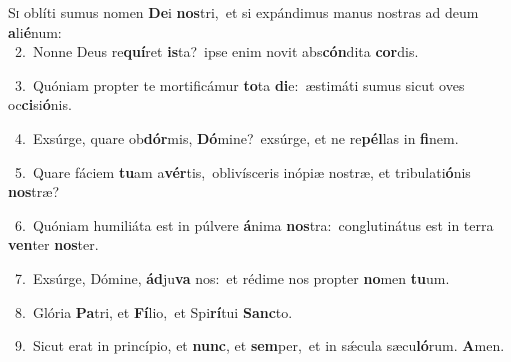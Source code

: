 \lettrine{\initial\textcolor{\initialcolor}{S}}{i} oblíti sumus nomen \textbf{De}\-i \textbf{nos}\-tri,~\star et si expándimus manus nostras ad deum \textbf{a}\-li\-\textbf{é}\-num:\\
{\numbfont\textcolor{\numbcolor}{~2.}}~Nonne Deus re\-\textbf{quí}\-ret \textbf{is}\-ta?~\star ipse enim novit abs\-\textbf{cón}\-dita \textbf{cor}\-dis.\par
{\numbfont\textcolor{\numbcolor}{~3.}}~Quóniam propter te mortificámur \textbf{to}\-ta \textbf{di}\-e:~\star æstimáti sumus sicut oves oc\-\textbf{ci}\-si\-\textbf{ó}\-nis.\par
{\numbfont\textcolor{\numbcolor}{~4.}}~Exsúrge, quare ob\-\textbf{dór}\-mis, \textbf{Dó}\-mine?~\star exsúrge, et ne re\-\textbf{pél}\-las in \textbf{fi}\-nem.\par
{\numbfont\textcolor{\numbcolor}{~5.}}~Quare fáciem \textbf{tu}\-am a\-\textbf{vér}\-tis,~\star oblivísceris inópiæ nostræ, et tribulati\-\textbf{ó}\-nis \textbf{nos}\-træ?\par
{\numbfont\textcolor{\numbcolor}{~6.}}~Quóniam humiliáta est in púlvere \textbf{á}\-nima \textbf{nos}\-tra:~\star conglutinátus est in terra \textbf{ven}\-ter \textbf{nos}\-ter.\par
{\numbfont\textcolor{\numbcolor}{~7.}}~Exsúrge, Dómine, \textbf{ád}\-ju\textbf{va} nos:~\star et rédime nos propter \textbf{no}\-men \textbf{tu}\-um.\par
{\numbfont\textcolor{\numbcolor}{~8.}}~Glória \textbf{Pa}\-tri, et \textbf{Fí}\-lio,~\star et Spi\-\textbf{rí}\-tui \textbf{Sanc}\-to.\par
{\numbfont\textcolor{\numbcolor}{~9.}}~Sicut erat in princípio, et \textbf{nunc}\-, et \textbf{sem}\-per,~\star et in sǽcula sæcu\-\textbf{ló}\-rum. \textbf{A}\-men.\par
